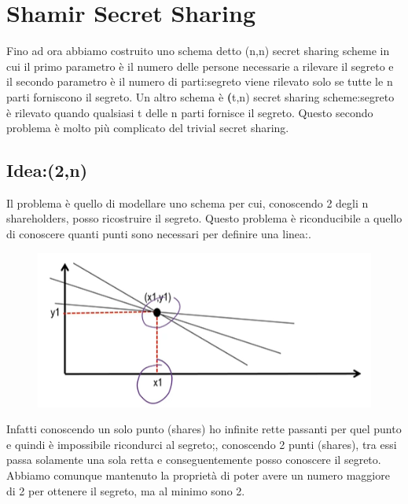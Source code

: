\documentclass{book}
\begin{document}
\section{Shamir Secret Sharing}
Fino ad ora abbiamo costruito uno schema detto (n,n) secret sharing scheme in cui il primo parametro è il numero delle persone necessarie a rilevare il segreto e il secondo parametro è il numero di parti:\@il segreto viene rilevato solo se tutte le n parti forniscono il segreto\@.\newline
Un altro schema è \textbf(t,n) secret sharing scheme:\@il segreto è rilevato quando qualsiasi t delle n parti fornisce il segreto\@. Questo secondo problema è molto più complicato del trivial secret sharing\@.
\subsection{Idea:\@Schema (2,n)}
Il problema è quello di modellare uno schema per cui, conoscendo 2 degli n shareholders, posso ricostruire il segreto\@. Questo problema è riconducibile a quello di conoscere quanti punti sono necessari per definire una linea:\@.
\begin{figure}[h]
    \centering
    \includegraphics[scale=0.5]{2021-12-26-18-33-00.png}%
\end{figure}
Infatti conoscendo un solo punto (shares) ho infinite rette passanti per quel punto e quindi è impossibile ricondurci al segreto;\@tuttavia, conoscendo 2 punti (shares), tra essi passa solamente una sola retta e conseguentemente posso conoscere il segreto\@. Abbiamo comunque mantenuto la proprietà di poter avere un numero maggiore di 2 per ottenere il segreto, ma al minimo sono 2\@.
\end{document}
